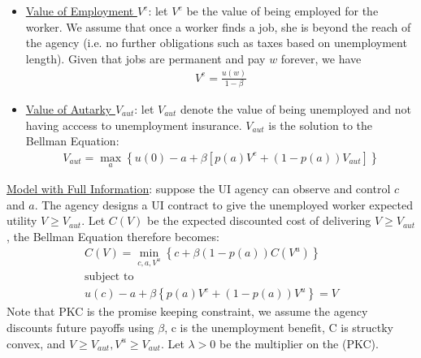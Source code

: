 \documentclass{article}
\begin{document}
\begin{itemize}
    \item  \underline{Value of Employment $V^{e}$}: let $V^{e}$ be the value of being employed for the worker. We assume that once a worker finds a job, she is beyond the reach of the agency (i.e. no further obligations such as taxes based on unemployment length). Given that jobs are permanent and pay $w$ forever, we have
    \begin{gather*}
        V^{e} = \frac{u(w)}{1 - \beta}
    \end{gather*}
    \item  \underline{Value of Autarky $V_{aut}$}: let $V_{aut}$ denote the value of being unemployed and not having acccess to unemployment insurance. $V_{aut}$ is the solution to the Bellman Equation:
    \begin{gather*}
        V_{aut} = \max_{a} \left\{ u(0) - a + \beta [p(a)V^{e} + (1-p(a)) V_{aut}] \right\}
    \end{gather*}
\end{itemize}
\vspace{2.5mm}
\par \underline{Model with Full Information}: suppose the UI agency can observe and control $c$ and $a$. The agency designs a UI contract to give the unemployed worker expected utility $V \geq V_{aut}$. Let $C(V)$ be the expected discounted cost of delivering $V \geq V_{aut}$, the Bellman Equation therefore becomes:
\begin{gather*}
    C(V) = \min_{c,a,V^{u}} \left\{ c + \beta (1 - p(a)) C(V^{u}) \right\} \\
    \text{subject to} \\
    u(c) - a + \beta \left\{p(a)V^{e} + (1 - p(a)) V^{u} \right\} = V \tag{PKC}
\end{gather*}
Note that PKC is the promise keeping constraint, we assume the agency discounts future payoffs using $\beta$, c is the unemployment benefit, C is structky convex, and $V \geq V_{aut}, V^{u} \geq V_{aut}$. Let $\lambda > 0$ be the multiplier on the (PKC).
\end{document}
